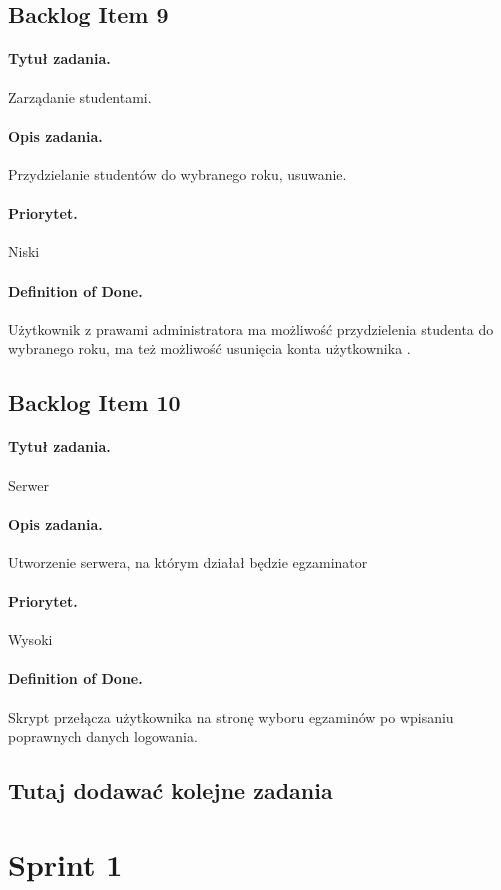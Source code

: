 \documentclass[a4paper]{article}
\begin{document}
\subsection{Backlog Item 9}
\paragraph{Tytuł zadania.} Zarządanie studentami.
\paragraph{Opis zadania.} Przydzielanie studentów do wybranego roku, usuwanie.
\paragraph{Priorytet.} Niski
\paragraph{Definition of Done.} Użytkownik z prawami administratora ma możliwość przydzielenia studenta do wybranego roku, ma też możliwość usunięcia konta użytkownika .

\subsection{Backlog Item 10}
\paragraph{Tytuł zadania.} Serwer
\paragraph{Opis zadania.} Utworzenie serwera, na którym działał będzie egzaminator
\paragraph{Priorytet.} Wysoki
\paragraph{Definition of Done.} Skrypt przełącza użytkownika na stronę wyboru egzaminów po wpisaniu poprawnych danych logowania. 

\subsection*{Tutaj dodawać kolejne zadania}

\section{Sprint 1} 
\end{document}
